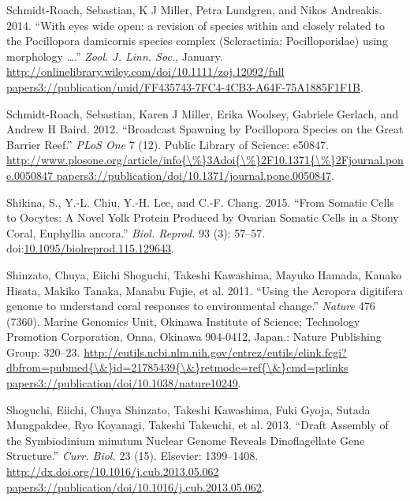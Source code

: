 \documentclass[]{elsarticle} %
\begin{document}
\hypertarget{ref-Schmidt-Roach2014}{}
Schmidt-Roach, Sebastian, K J Miller, Petra Lundgren, and Nikos
Andreakis. 2014. ``With eyes wide open: a revision of species within and
closely related to the Pocillopora damicornis species complex
(Scleractinia; Pocilloporidae) using morphology \ldots{}.'' \emph{Zool.
J. Linn. Soc.}, January.
\href{http://onlinelibrary.wiley.com/doi/10.1111/zoj.12092/full\%20papers3://publication/uuid/FF435743-7FC4-4CB3-A64F-75A1885F1F1B}{http://onlinelibrary.wiley.com/doi/10.1111/zoj.12092/full papers3://publication/uuid/FF435743-7FC4-4CB3-A64F-75A1885F1F1B}.

\hypertarget{ref-Schmidt-Roach2012}{}
Schmidt-Roach, Sebastian, Karen J Miller, Erika Woolsey, Gabriele
Gerlach, and Andrew H Baird. 2012. ``Broadcast Spawning by Pocillopora
Species on the Great Barrier Reef.'' \emph{PLoS One} 7 (12). Public
Library of Science: e50847.
\href{http://www.plosone.org/article/info\%7B/\%\%7D3Adoi\%7B/\%\%7D2F10.1371\%7B/\%\%7D2Fjournal.pone.0050847\%20papers3://publication/doi/10.1371/journal.pone.0050847}{http://www.plosone.org/article/info\{\textbackslash{}\%\}3Adoi\{\textbackslash{}\%\}2F10.1371\{\textbackslash{}\%\}2Fjournal.pone.0050847 papers3://publication/doi/10.1371/journal.pone.0050847}.

\hypertarget{ref-Shikina2015}{}
Shikina, S., Y.-L. Chiu, Y.-H. Lee, and C.-F. Chang. 2015. ``From
Somatic Cells to Oocytes: A Novel Yolk Protein Produced by Ovarian
Somatic Cells in a Stony Coral, Euphyllia ancora.'' \emph{Biol. Reprod.}
93 (3): 57--57.
doi:\href{https://doi.org/10.1095/biolreprod.115.129643}{10.1095/biolreprod.115.129643}.

\hypertarget{ref-Shinzato2011}{}
Shinzato, Chuya, Eiichi Shoguchi, Takeshi Kawashima, Mayuko Hamada,
Kanako Hisata, Makiko Tanaka, Manabu Fujie, et al. 2011. ``Using the
Acropora digitifera genome to understand coral responses to
environmental change.'' \emph{Nature} 476 (7360). Marine Genomics Unit,
Okinawa Institute of Science; Technology Promotion Corporation, Onna,
Okinawa 904-0412, Japan.: Nature Publishing Group: 320--23.
\href{http://eutils.ncbi.nlm.nih.gov/entrez/eutils/elink.fcgi?dbfrom=pubmed\%7B/\&\%7Did=21785439\%7B/\&\%7Dretmode=ref\%7B/\&\%7Dcmd=prlinks\%20papers3://publication/doi/10.1038/nature10249}{http://eutils.ncbi.nlm.nih.gov/entrez/eutils/elink.fcgi?dbfrom=pubmed\{\textbackslash{}\&\}id=21785439\{\textbackslash{}\&\}retmode=ref\{\textbackslash{}\&\}cmd=prlinks papers3://publication/doi/10.1038/nature10249}.

\hypertarget{ref-Shoguchi2013}{}
Shoguchi, Eiichi, Chuya Shinzato, Takeshi Kawashima, Fuki Gyoja, Sutada
Mungpakdee, Ryo Koyanagi, Takeshi Takeuchi, et al. 2013. ``Draft
Assembly of the Symbiodinium minutum Nuclear Genome Reveals
Dinoflagellate Gene Structure.'' \emph{Curr. Biol.} 23 (15). Elsevier:
1399--1408.
\href{http://dx.doi.org/10.1016/j.cub.2013.05.062\%20papers3://publication/doi/10.1016/j.cub.2013.05.062}{http://dx.doi.org/10.1016/j.cub.2013.05.062 papers3://publication/doi/10.1016/j.cub.2013.05.062}.
\end{document}
